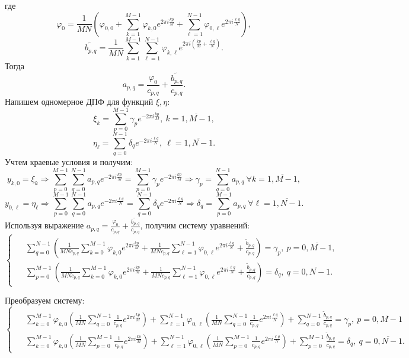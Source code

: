 \documentclass[11pt]{article}
\begin{document}
где
\[
\varphi_{0} = \frac{1}{MN} \left( \varphi_{0,0} + \sum_{k=1}^{M-1} \varphi_{k,0} e^{2\pi i \frac{kp}{M}} + \sum_{\ell=1}^{N-1} \varphi_{0,\ell} e^{2\pi i \frac{\ell q}{N}} \right),
\]
\[
\tilde{b_{p,q}} = \frac{1}{MN} \sum_{k=1}^{M-1} \sum_{\ell=1}^{N-1} \varphi_{k,\ell} e^{2\pi i \left( \frac{kp}{M} + \frac{\ell q}{N} \right)}.
\]
Тогда
\[
a_{p, q} = \frac{\varphi_0}{c_{p, q}} + \frac{\tilde{b_{p,q}}}{c_{p, q}}.
\]
Напишем одномерное ДПФ для функций $\xi, \eta$:
\[
\xi_k = \sum_{p=0}^{M-1} \gamma_p e^{-2\pi i \frac{kp}{M}}, \ k = \overline{1, M-1},
\]
\[
\eta_\ell = \sum_{q=0}^{N-1} \delta_q e^{-2\pi i \frac{\ell q}{N}}, \ \ell = \overline{1, N-1}.
\]
Учтем краевые условия и получим:
\[
y_{k,0} =\xi_k \Rightarrow \sum_{p=0}^{M-1} \sum_{q=0}^{N-1} a_{p,q} e^{-2\pi i \frac{kp}{M}} = \sum_{p=0}^{M-1} \gamma_p e^{-2\pi i \frac{kp}{M}} \Rightarrow \gamma_p = \sum_{q=0}^{N-1} a_{p,q} \ \forall k = \overline{1, M-1}, 
\]
\[
y_{0,\ell} = \eta_\ell \Rightarrow \sum_{p=0}^{M-1} \sum_{q=0}^{N-1} a_{p,q} e^{-2\pi i \frac{\ell q}{N}} =  \sum_{q=0}^{N-1} \delta_q e^{-2\pi i \frac{\ell q}{N}} \Rightarrow \delta_q = \sum_{p=0}^{M-1} a_{p,q} \ \forall \ell = \overline{1, N-1}.
\]
Используя выражение $a_{p, q} = \frac{\varphi_0}{c_{p, q}} + \frac{\tilde{b_{p,q}}}{c_{p, q}}$, получим систему уравнений:
\begin{equation*}
\begin{cases}
\begin{aligned}
&\sum_{q=0}^{N-1}\left(\frac{1}{MNc_{p,q}}\sum_{k=0}^{M-1}\varphi_{k, 0}e^{2\pi i \frac{kp}{M}} + \frac{1}{MNc_{p,q}}\sum_{\ell=1}^{N-1}\varphi_{0, \ell}e^{2\pi i \frac{\ell q}{N}} + \frac{\tilde{b}_{p,q}}{c_{p, q}}\right) = \gamma_p, \ p = \overline{0, M-1},\\
&\sum_{p=0}^{M-1}\left(\frac{1}{MNc_{p,q}}\sum_{k=0}^{M-1}\varphi_{k, 0}e^{2\pi i \frac{kp}{M}} + \frac{1}{MNc_{p,q}}\sum_{\ell=1}^{N-1}\varphi_{0, \ell}e^{2\pi i \frac{\ell q}{N}} + \frac{\tilde{b}_{p,q}}{c_{p, q}}\right) = \delta_q, \ q = \overline{0, N-1}.
\end{aligned}
\end{cases}
\end{equation*}

Преобразуем систему:
\begin{equation*}
\begin{cases}
\begin{aligned}
 &\sum_{k=0}^{M-1}\varphi_{k, 0}\left(\frac{1}{MN}\sum_{q=0}^{N-1}\frac{1}{c_{p,q}}e^{2\pi i \frac{kp}{M}}\right) + \sum_{\ell=1}^{N-1}\varphi_{0, \ell}\left(
\frac{1}{MN}\sum_{q=0}^{N-1}\frac{1}{c_{p,q}}e^{2\pi i \frac{\ell q}{N}}\right) + \sum_{q=0}^{N-1}\frac{\tilde{b}_{p,q}}{c_{p,q}} = \gamma_p, \ p = \overline{0, M-1}\\

&\sum_{k=0}^{M-1}\varphi_{k, 0}\left(\frac{1}{MN}\sum_{p=0}^{M-1}\frac{1}{c_{p,q}}e^{2\pi i \frac{kp}{M}}\right) + \sum_{\ell=1}^{N-1}\varphi_{0, \ell}\left(
\frac{1}{MN}\sum_{p=0}^{M-1}\frac{1}{c_{p,q}}e^{2\pi i \frac{\ell q}{N}}\right) + \sum_{p=0}^{M-1}\frac{\tilde{b}_{p,q}}{c_{p,q}} = \delta_q, \ q = \overline{0, N-1}.
\end{aligned}
\end{cases}
\end{equation*}
\end{document}

